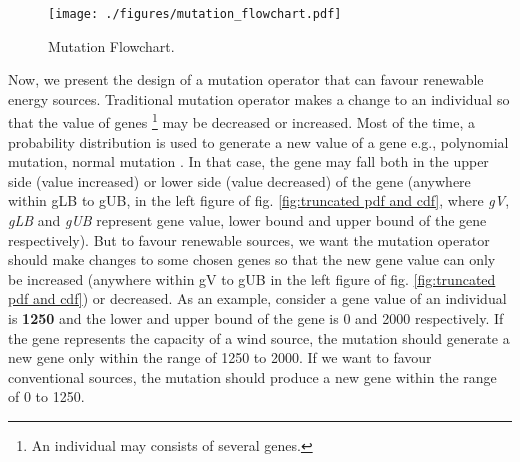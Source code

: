 \documentclass{article}
\begin{document}
%



\begin{figure}
\centering

\texttt{[image: ./figures/mutation\_flowchart.pdf]}
\caption{Mutation Flowchart.}
\label{fig:mutation flowchart}
\end{figure}

Now, we present the design of a mutation operator that can favour renewable energy sources. 
Traditional mutation operator makes a change to an individual so that the value of genes \footnote{An individual may consists of several genes.} may be decreased or increased. 
Most of the time, a probability distribution is used to generate a new value of a gene e.g., polynomial mutation, normal mutation \cite{Deb_2001}. 
In that case, the gene may fall both in the upper side (value increased) or lower side (value decreased) of the gene (anywhere within gLB to gUB, in the left figure of fig. \ref{fig:truncated pdf and cdf}, where \textit{gV}, \textit{gLB} and \textit{gUB} represent gene value, lower bound and upper bound of the gene respectively).
But to favour renewable sources, we want the mutation operator should make changes to some chosen genes so that the new gene value can only be increased (anywhere within gV to gUB in the left figure of fig. \ref{fig:truncated pdf and cdf}) or decreased.
As an example, consider a gene value of an individual is \textbf{1250} and the lower and upper bound of the gene is 0 and 2000 respectively. 
If the gene represents the capacity of a wind source, the mutation should generate a new gene only within the range of 1250 to 2000. 
If we want to favour conventional sources, the mutation should produce a new gene within the range of 0 to 1250. 
\end{document}
